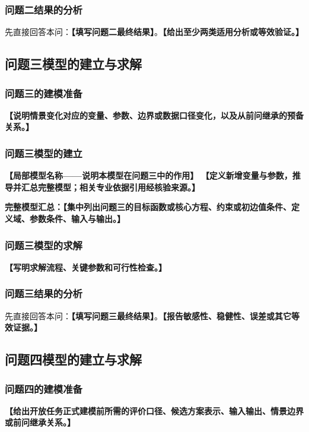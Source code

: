 \documentclass[UTF8,a4paper,12pt,zihao=-4]{ctexart}
\newcommand{\TemplateField}[1]{\textbf{【#1】}}
\begin{document}
\subsubsection{问题二结果的分析}
先直接回答本问：\textbf{【填写问题二最终结果】}。\TemplateField{给出至少两类适用分析或等效验证。}

\subsection{问题三模型的建立与求解}

\subsubsection{问题三的建模准备}
\TemplateField{说明情景变化对应的变量、参数、边界或数据口径变化，以及从前问继承的预备关系。}

\subsubsection{问题三模型的建立}
\noindent\TemplateField{局部模型名称——说明本模型在问题三中的作用}
\TemplateField{定义新增变量与参数，推导并汇总完整模型；相关专业依据引用经核验来源\cite{topic-ref-4}。}

\noindent\textbf{完整模型汇总：}\TemplateField{集中列出问题三的目标函数或核心方程、约束或初边值条件、定义域、参数条件、输入与输出。}

\subsubsection{问题三模型的求解}
\TemplateField{写明求解流程、关键参数和可行性检查。}

\subsubsection{问题三结果的分析}
先直接回答本问：\textbf{【填写问题三最终结果】}。\TemplateField{报告敏感性、稳健性、误差或其它等效证据。}

\subsection{问题四模型的建立与求解}

\subsubsection{问题四的建模准备}
\TemplateField{给出开放任务正式建模前所需的评价口径、候选方案表示、输入输出、情景边界或前问继承关系。}
\end{document}
